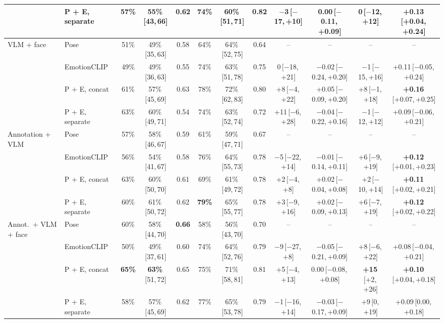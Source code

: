 \documentclass[11pt]{article}
\newcommand{\best}[1]{\textbf{#1}}
\newcommand{\ci}[2]{\,[#1,\,#2]}
\begin{document}
\begin{table}[!htbp]
{\begin{tabular}{llcccccccccc}
 & P + E, separate & 57\% & 55\%\ci{43}{66} & 0.62 & 74\% & 60\%\ci{51}{71} & \best{0.82} & $-$3\ci{$-$17}{+10} & 0.00\ci{$-$0.11}{+0.09} & 0\ci{$-$12}{+12} & \best{+0.13}\ci{+0.04}{+0.24} \\
\midrule
\multirow{4}{*}{VLM + face} & Pose & 51\% & 49\%\ci{35}{63} & 0.58 & 64\% & 64\%\ci{52}{75} & 0.64 & -- & -- & -- & -- \\
 & EmotionCLIP & 49\% & 49\%\ci{36}{63} & 0.55 & 74\% & 63\%\ci{51}{78} & 0.75 & 0\ci{$-$18}{+21} & $-$0.02\ci{$-$0.24}{+0.20} & $-$1\ci{$-$15}{+16} & +0.11\ci{$-$0.05}{+0.24} \\
 & P + E, concat & 61\% & 57\%\ci{45}{69} & 0.63 & 78\% & 72\%\ci{62}{83} & 0.80 & +8\ci{$-$4}{+22} & +0.05\ci{$-$0.09}{+0.20} & +8\ci{$-$1}{+18} & \best{+0.16}\ci{+0.07}{+0.25} \\
 & P + E, separate & 63\% & 60\%\ci{49}{71} & 0.54 & 74\% & 63\%\ci{52}{74} & 0.72 & +11\ci{$-$6}{+28} & $-$0.04\ci{$-$0.22}{+0.16} & $-$1\ci{$-$12}{+12} & +0.09\ci{$-$0.06}{+0.21} \\
\midrule
\multirow{4}{*}{Annotation + VLM} & Pose & 57\% & 58\%\ci{46}{67} & 0.59 & 61\% & 59\%\ci{47}{71} & 0.67 & -- & -- & -- & -- \\
 & EmotionCLIP & 56\% & 54\%\ci{41}{67} & 0.58 & 76\% & 64\%\ci{55}{73} & 0.78 & $-$5\ci{$-$22}{+14} & $-$0.01\ci{$-$0.14}{+0.11} & +6\ci{$-$9}{+19} & \best{+0.12}\ci{+0.01}{+0.23} \\
 & P + E, concat & 63\% & 60\%\ci{50}{70} & 0.61 & 69\% & 61\%\ci{49}{72} & 0.78 & +2\ci{$-$4}{+8} & +0.02\ci{$-$0.04}{+0.08} & +2\ci{$-$10}{+14} & \best{+0.11}\ci{+0.02}{+0.21} \\
 & P + E, separate & 60\% & 61\%\ci{50}{72} & 0.62 & \best{79\%} & 65\%\ci{55}{77} & 0.78 & +3\ci{$-$9}{+16} & +0.02\ci{$-$0.09}{+0.13} & +6\ci{$-$7}{+19} & \best{+0.12}\ci{+0.02}{+0.22} \\
\midrule
\multirow{4}{*}{Annot.\ + VLM + face} & Pose & 60\% & 58\%\ci{44}{70} & \best{0.66} & 58\% & 56\%\ci{43}{70} & 0.70 & -- & -- & -- & -- \\
 & EmotionCLIP & 50\% & 49\%\ci{37}{61} & 0.60 & 74\% & 64\%\ci{52}{76} & 0.79 & $-$9\ci{$-$27}{+8} & $-$0.05\ci{$-$0.21}{+0.09} & +8\ci{$-$6}{+22} & +0.08\ci{$-$0.04}{+0.21} \\
 & P + E, concat & \best{65\%} & \best{63\%}\ci{51}{72} & 0.65 & 75\% & 71\%\ci{58}{81} & 0.81 & +5\ci{$-$4}{+13} & 0.00\ci{$-$0.08}{+0.08} & \best{+15}\ci{+2}{+26} & \best{+0.10}\ci{+0.04}{+0.18} \\
 & P + E, separate & 58\% & 57\%\ci{45}{69} & 0.62 & 77\% & 65\%\ci{53}{78} & 0.79 & $-$1\ci{$-$16}{+14} & $-$0.03\ci{$-$0.17}{+0.09} & +9\ci{0}{+19} & +0.09\ci{0.00}{+0.18} \\

\end{tabular}}
\end{table}
\end{document}
